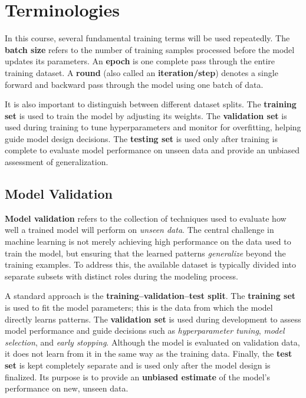 \documentclass{article}
\begin{document}
\section{Terminologies}

In this course, several fundamental training terms will be used repeatedly. 
The \textbf{batch size} refers to the number of training samples processed before the model updates its parameters. 
An \textbf{epoch} is one complete pass through the entire training dataset. 
A \textbf{round} (also called an \textbf{iteration/step})  denotes a single forward and backward pass through the model using one batch of data. 

It is also important to distinguish between different dataset splits. The \textbf{training set} is used to train the model by adjusting its weights. The \textbf{validation set} is used during training to tune hyperparameters and monitor for overfitting, helping guide model design decisions. The \textbf{testing set} is used only after training is complete to evaluate model performance on unseen data and provide an unbiased assessment of generalization.

\subsection{Model Validation}

\textbf{Model validation} refers to the collection of techniques used to evaluate how well a trained model will perform on \textit{unseen data}. The central challenge in machine learning is not merely achieving high performance on the data used to train the model, but ensuring that the learned patterns \textit{generalize} beyond the training examples. To address this, the available dataset is typically divided into separate subsets with distinct roles during the modeling process.

A standard approach is the \textbf{training--validation--test split}. The \textbf{training set} is used to fit the model parameters; this is the data from which the model directly learns patterns. The \textbf{validation set} is used during development to assess model performance and guide decisions such as \textit{hyperparameter tuning}, \textit{model selection}, and \textit{early stopping}. Although the model is evaluated on validation data, it does not learn from it in the same way as the training data. Finally, the \textbf{test set} is kept completely separate and is used only after the model design is finalized. Its purpose is to provide an \textbf{unbiased estimate} of the model’s performance on new, unseen data.
\end{document}
